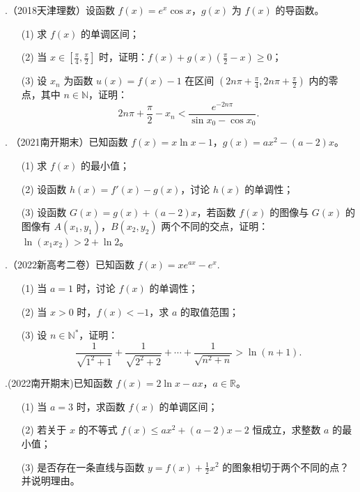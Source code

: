 \documentclass{article}
\begin{document}
\newpage
{}.（2018天津理数）设函数 \(f(x) = e^x \cos x\)，\(g(x)\) 为 \(f(x)\) 的导函数。

\begin{enumerate}
    \item[(1)] 求 \(f(x)\) 的单调区间；
    \item[(2)] 当 \(x \in \left[\frac{\pi}{4}, \frac{\pi}{2}\right]\) 时，证明：\(f(x) + g(x)\left(\frac{\pi}{2} - x\right) \geq 0\)；
    \item[(3)] 设 \(x_n\) 为函数 \(u(x) = f(x) - 1\) 在区间 \(\left(2n\pi + \frac{\pi}{4}, 2n\pi + \frac{\pi}{2}\right)\) 内的零点，其中 \(n \in \mathbb{N}\)，证明：
    \[
    2n\pi + \frac{\pi}{2} - x_n < \frac{e^{-2n\pi}}{\sin x_0 - \cos x_0}.
    \]
\end{enumerate}
\vspace{20\baselineskip}

. （2021南开期末）已知函数 \(f(x) = x\ln x - 1\)，\(g(x) = ax^2 - (a-2)x\)。

\begin{enumerate}
    \item[(1)] 求 \(f(x)\) 的最小值；
    \item[(2)] 设函数 \(h(x) = f'(x) - g(x)\)，讨论 \(h(x)\) 的单调性；
    \item[(3)] 设函数 \(G(x) = g(x) + (a-2)x\)，若函数 \(f(x)\) 的图像与 \(G(x)\) 的图像有 \(A(x_1, y_1)\)，\(B(x_2, y_2)\) 两个不同的交点，证明：\(\ln(x_1x_2) > 2 + \ln 2\)。
\end{enumerate}
\vspace{20\baselineskip}
\newpage

.（2022新高考二卷）已知函数 \(f(x) = x e^{ax} - e^x\).

\begin{enumerate}
    \item[(1)] 当 \(a = 1\) 时，讨论 \(f(x)\) 的单调性；
    \item[(2)] 当 \(x > 0\) 时，\(f(x) < -1\)，求 \(a\) 的取值范围；
    \item[(3)] 设 \(n \in \mathbb{N}^*\)，证明：
    \[
    \frac{1}{\sqrt{1^2+1}} + \frac{1}{\sqrt{2^2+2}} + \cdots + \frac{1}{\sqrt{n^2+n}} > \ln(n+1).
    \]
\end{enumerate}
\vspace{20\baselineskip}

.(2022南开期末)已知函数 \(f(x) = 2\ln x - ax\)，\(a \in \mathbb{R}\)。

\begin{enumerate}
    \item[(1)] 当 \(a = 3\) 时，求函数 \(f(x)\) 的单调区间；
    \item[(2)] 若关于 \(x\) 的不等式 \(f(x) \leq ax^2 + (a-2)x - 2\) 恒成立，求整数 \(a\) 的最小值；
    \item[(3)] 是否存在一条直线与函数 \(y = f(x) + \frac{1}{2}x^2\) 的图象相切于两个不同的点？并说明理由。
\end{enumerate}
\newpage
\end{document}
